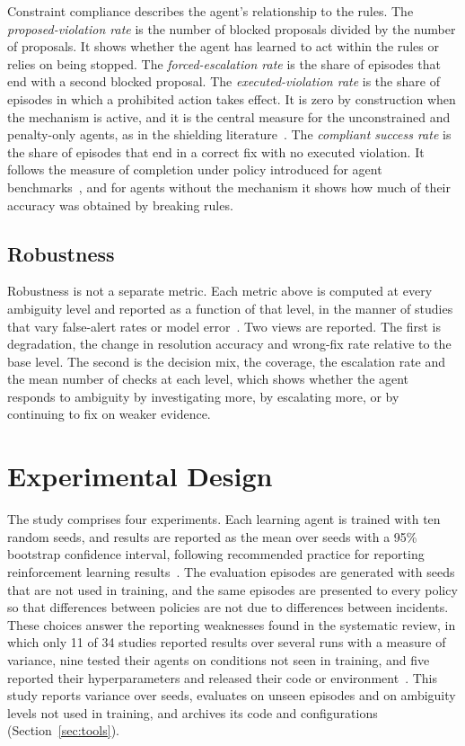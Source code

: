 Constraint compliance describes the agent's relationship to the rules. The \emph{proposed-violation rate} is the number of blocked proposals divided by the number of proposals. It shows whether the agent has learned to act within the rules or relies on being stopped. The \emph{forced-escalation rate} is the share of episodes that end with a second blocked proposal. The \emph{executed-violation rate} is the share of episodes in which a prohibited action takes effect. It is zero by construction when the mechanism is active, and it is the central measure for the unconstrained and penalty-only agents, as in the shielding literature~\cite{alshiekh2018,jansen2020}. The \emph{compliant success rate} is the share of episodes that end in a correct fix with no executed violation. It follows the measure of completion under policy introduced for agent benchmarks~\cite{levy2026}, and for agents without the mechanism it shows how much of their accuracy was obtained by breaking rules.

\subsection{Robustness}

Robustness is not a separate metric. Each metric above is computed at every ambiguity level and reported as a function of that level, in the manner of studies that vary false-alert rates or model error~\cite{kim2025,hammar2025}. Two views are reported. The first is degradation, the change in resolution accuracy and wrong-fix rate relative to the base level. The second is the decision mix, the coverage, the escalation rate and the mean number of checks at each level, which shows whether the agent responds to ambiguity by investigating more, by escalating more, or by continuing to fix on weaker evidence.

\section{Experimental Design}
\label{sec:experiments}

The study comprises four experiments. Each learning agent is trained with ten random seeds, and results are reported as the mean over seeds with a 95\% bootstrap confidence interval, following recommended practice for reporting reinforcement learning results~\cite{agarwal2021}. The evaluation episodes are generated with seeds that are not used in training, and the same episodes are presented to every policy so that differences between policies are not due to differences between incidents. These choices answer the reporting weaknesses found in the systematic review, in which only 11 of 34 studies reported results over several runs with a measure of variance, nine tested their agents on conditions not seen in training, and five reported their hyperparameters and released their code or environment~\cite{opol2026slr}. This study reports variance over seeds, evaluates on unseen episodes and on ambiguity levels not used in training, and archives its code and configurations (Section~\ref{sec:tools}).

